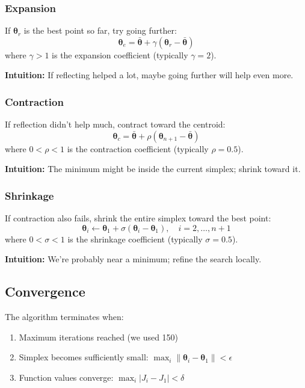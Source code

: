 \documentclass[11pt]{article}
\begin{document}
\subsubsection{Expansion}

If $\boldsymbol{\theta}_r$ is the best point so far, try going further:
\begin{equation}
    \boldsymbol{\theta}_e = \bar{\boldsymbol{\theta}} + \gamma(\boldsymbol{\theta}_r - \bar{\boldsymbol{\theta}})
\end{equation}
where $\gamma > 1$ is the expansion coefficient (typically $\gamma = 2$).

\textbf{Intuition:} If reflecting helped a lot, maybe going further will help even more.

\subsubsection{Contraction}

If reflection didn't help much, contract toward the centroid:
\begin{equation}
    \boldsymbol{\theta}_c = \bar{\boldsymbol{\theta}} + \rho(\boldsymbol{\theta}_{n+1} - \bar{\boldsymbol{\theta}})
\end{equation}
where $0 < \rho < 1$ is the contraction coefficient (typically $\rho = 0.5$).

\textbf{Intuition:} The minimum might be inside the current simplex; shrink toward it.

\subsubsection{Shrinkage}

If contraction also fails, shrink the entire simplex toward the best point:
\begin{equation}
    \boldsymbol{\theta}_i \leftarrow \boldsymbol{\theta}_1 + \sigma(\boldsymbol{\theta}_i - \boldsymbol{\theta}_1), \quad i = 2, \ldots, n+1
\end{equation}
where $0 < \sigma < 1$ is the shrinkage coefficient (typically $\sigma = 0.5$).

\textbf{Intuition:} We're probably near a minimum; refine the search locally.

\subsection{Convergence}

The algorithm terminates when:
\begin{enumerate}
    \item Maximum iterations reached (we used 150)
    \item Simplex becomes sufficiently small: $\max_i \|\boldsymbol{\theta}_i - \boldsymbol{\theta}_1\| < \epsilon$
    \item Function values converge: $\max_i |J_i - J_1| < \delta$
\end{enumerate}
\end{document}
